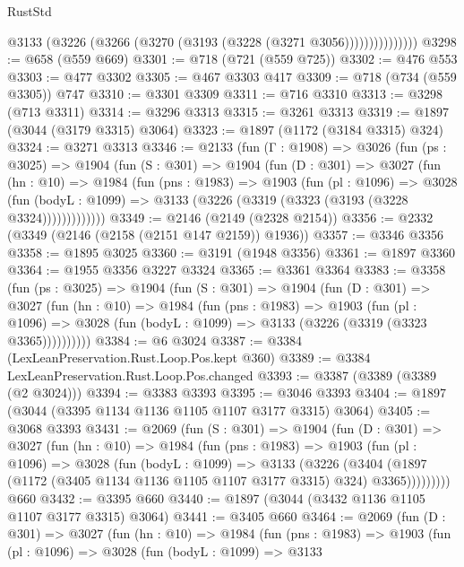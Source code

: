 \begin{lexlean}{RustStd}
\begin{coremodule}
                    @3133 (@3226 (@3266 (@3270 (@3193 (@3228 (@3271 @3056)))))))))))))))
@3298 := @658 (@559 @669)
@3301 := @718 (@721 (@559 @725))
@3302 := @476 @553
@3303 := @477 @3302
@3305 := @467 @3303 @417
@3309 := @718 (@734 (@559 @3305)) @747
@3310 := @3301 @3309
@3311 := @716 @3310
@3313 := @3298 (@713 @3311)
@3314 := @3296 @3313
@3315 := @3261 @3313
@3319 := @1897 (@3044 (@3179 @3315) @3064)
@3323 := @1897 (@1172 (@3184 @3315) @324)
@3324 := @3271 @3313
@3346 := @2133
    (fun (Γ : @1908) =>
    @3026
      (fun (ps : @3025) =>
      @1904
        (fun (S : @301) =>
        @1904
          (fun (D : @301) =>
          @3027
            (fun (hn : @10) =>
            @1984
              (fun (pns : @1983) =>
              @1903
                (fun (pl : @1096) =>
                @3028
                  (fun (bodyL : @1099) =>
                  @3133 (@3226 (@3319 (@3323 (@3193 (@3228 @3324)))))))))))))
@3349 := @2146 (@2149 (@2328 @2154))
@3356 := @2332 (@3349 (@2146 (@2158 (@2151 @147 @2159)) @1936))
@3357 := @3346 @3356
@3358 := @1895 @3025
@3360 := @3191 (@1948 @3356)
@3361 := @1897 @3360
@3364 := @1955 @3356 @3227 @3324
@3365 := @3361 @3364
@3383 := @3358
    (fun (ps : @3025) =>
    @1904
      (fun (S : @301) =>
      @1904
        (fun (D : @301) =>
        @3027
          (fun (hn : @10) =>
          @1984
            (fun (pns : @1983) =>
            @1903
              (fun (pl : @1096) =>
              @3028 (fun (bodyL : @1099) => @3133 (@3226 (@3319 (@3323 @3365))))))))))
@3384 := @6 @3024
@3387 := @3384 (LexLeanPreservation.Rust.Loop.Pos.kept @360)
@3389 := @3384 LexLeanPreservation.Rust.Loop.Pos.changed
@3393 := @3387 (@3389 (@3389 (@2 @3024)))
@3394 := @3383 @3393
@3395 := @3046 @3393
@3404 := @1897 (@3044 (@3395 @1134 @1136 @1105 @1107 @3177 @3315) @3064)
@3405 := @3068 @3393
@3431 := @2069
    (fun (S : @301) =>
    @1904
      (fun (D : @301) =>
      @3027
        (fun (hn : @10) =>
        @1984
          (fun (pns : @1983) =>
          @1903
            (fun (pl : @1096) =>
            @3028
              (fun (bodyL : @1099) =>
              @3133
                (@3226
                  (@3404
                    (@1897 (@1172 (@3405 @1134 @1136 @1105 @1107 @3177 @3315) @324) @3365)))))))))
    @660
@3432 := @3395 @660
@3440 := @1897 (@3044 (@3432 @1136 @1105 @1107 @3177 @3315) @3064)
@3441 := @3405 @660
@3464 := @2069
    (fun (D : @301) =>
    @3027
      (fun (hn : @10) =>
      @1984
        (fun (pns : @1983) =>
        @1903
          (fun (pl : @1096) =>
          @3028
            (fun (bodyL : @1099) =>
            @3133

\end{coremodule}
\end{lexlean}
